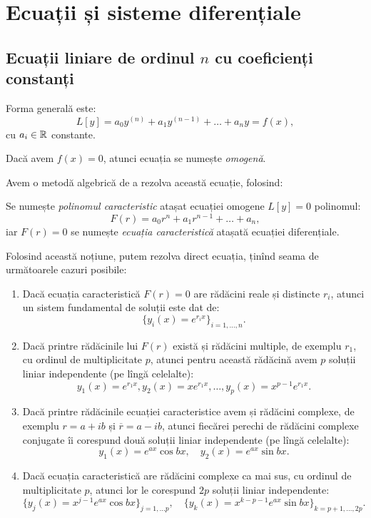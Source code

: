 
\chapter{Ecuații și sisteme diferențiale}

\section{Ecuații liniare de ordinul $n$ cu coeficienți constanți}

Forma generală este:
\[
  L[y] = a_0 y^{(n)} + a_1 y^{(n-1)} + \dots + a_n y = f(x),
\]
cu $a_i \in \mathbb{R}$ constante.

Dacă avem $f(x) = 0$, atunci ecuația se numește \emph{omogenă}.

Avem o metodă algebrică de a rezolva această ecuație, folosind:

\begin{definition}\label{def:pol-car-ec}
  Se numește \emph{polinomul caracteristic} atașat ecuației omogene $L[y] = 0$
  polinomul:
  \[
    F(r) = a_0 r^n + a_1 r^{n-1} + \dots + a_n,
  \]
  iar $F(r) = 0$ se numește \emph{ecuația caracteristică} atașată ecuației diferențiale.
\end{definition}

Folosind această noțiune, putem rezolva direct ecuația, ținînd seama de următoarele
cazuri posibile:

\begin{theorem}\label{thm:ec-car-dif}
  \begin{enumerate}[(1)]
  \item Dacă ecuația caracteristică $F(r) = 0$ are rădăcini reale și distincte $r_i$,
    atunci un sistem fundamental de soluții este dat de:
    \[
      \big\{ y_i(x) = e^{r_i x} \big\}_{i=1,\dots,n}.
    \]
  \item Dacă printre rădăcinile lui $F(r)$ există și rădăcini multiple, de exemplu
    $r_1$, cu ordinul de multiplicitate $p$, atunci pentru această rădăcină avem
    $p$ soluții liniar independente (pe lîngă celelalte):
    \[
      y_1(x) = e^{r_1 x}, y_2(x) = xe^{r_1 x}, \dots, y_p(x) = x^{p-1} e^{r_1 x}.
    \]
  \item Dacă printre rădăcinile ecuației caracteristice avem și rădăcini complexe,
    de exemplu $r = a + ib$ și $\overline{r} = a - ib$, atunci fiecărei perechi
    de rădăcini complexe conjugate îi corespund două soluții liniar independente
    (pe lîngă celelalte):
    \[
      y_1(x) = e^{ax} \cos bx, \quad y_2(x) = e^{ax} \sin bx.
    \]
  \item Dacă ecuația caracteristică are rădăcini complexe ca mai sus, cu ordinul
    de multiplicitate $p$, atunci lor le corespund $2p$ soluții liniar independente:
    \[
      \big\{ y_j(x) = x^{j-1} e^{ax} \cos bx \big\}_{j=1, \dots p}, \quad
      \big\{ y_k(x) = x^{k-p-1} e^{ax} \sin bx\big\}_{k=p+1, \dots, 2p}.
    \]
  \end{enumerate}
\end{theorem}

